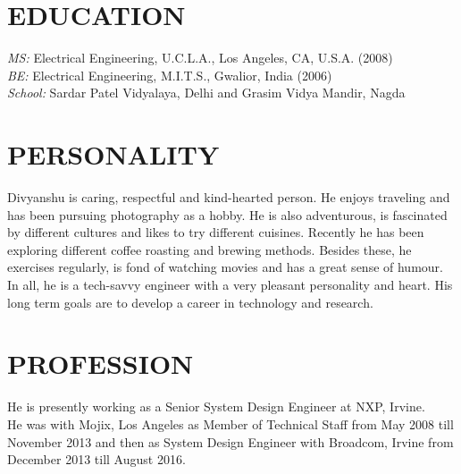 \documentclass[margin, 10pt]{res} %
\begin{document}
\begin{resume}
\section{EDUCATION}

{\sl MS:} Electrical Engineering, U.C.L.A., Los Angeles, CA, U.S.A. (2008)   \\
{\sl BE:} Electrical Engineering, M.I.T.S., Gwalior, India (2006) \\ 
{\sl School:} Sardar Patel Vidyalaya, Delhi and Grasim Vidya Mandir, Nagda
 

\section{PERSONALITY} 

Divyanshu is caring, respectful and  kind-hearted person. He enjoys traveling and has been pursuing photography as a hobby. He is also adventurous, is fascinated by different cultures and likes to try different cuisines. Recently he has been exploring different coffee roasting and brewing methods. Besides these, he exercises regularly, is fond of watching movies and has a great sense of humour. \\
In all, he is a tech-savvy engineer with a very pleasant personality and heart. His long term goals are to develop a career in technology and research. 
 
 
\section{PROFESSION}
He is presently working as a Senior System Design Engineer at NXP, Irvine.\\
He was with Mojix, Los Angeles  as Member of Technical Staff from May 2008 till November 2013 and then as System Design Engineer with Broadcom, Irvine from December 2013 till August 2016.
 
 

\end{resume}
\end{document}
